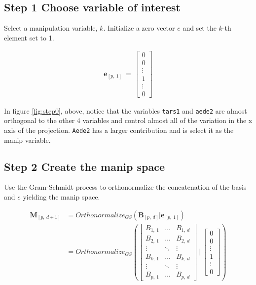 \documentclass{monashthesis}
\begin{document}
\subsection{Step 1 Choose variable of
interest}\label{step-1-choose-variable-of-interest}

Select a manipulation variable, \(k\). Initialize a zero vector \(e\)
and set the \(k\)-th element set to 1.

\begin{align*}
\textbf{e}_{[p,~1]} ~=~
  \begin{bmatrix}
    0 \\
    0 \\
    \vdots \\
    1 \\
    \vdots \\
    0
  \end{bmatrix}
\end{align*}

In figure \ref{fig:step0}, above, notice that the variables
\texttt{tars1} and \texttt{aede2} are almost orthogonal to the other 4
variables and control almost all of the variation in the x axis of the
projection. \texttt{Aede2} has a larger contribution and is select it as
the manip variable.

\subsection{Step 2 Create the manip
space}\label{step-2-create-the-manip-space}

Use the Gram-Schmidt process to orthonormalize the concatenation of the
basis and \(e\) yielding the manip space.

\begin{align*}
  \textbf{M}_{[p,~d+1]}
  &= Orthonormalize_{GS}( \textbf{B}_{[p,~d]}|\textbf{e}_{[p,~1]} ) \\
  &= Orthonormalize_{GS}
  \left(
    \begin{bmatrix}
      B_{1,~1} & \dots  & B_{1,~d} \\
      B_{2,~1} & \dots  & B_{2,~d} \\
      \vdots   & \ddots & \vdots   \\
      B_{k,~1} & \dots  & B_{k,~d} \\
      \vdots   & \ddots & \vdots   \\
      B_{p,~1} & \dots  & B_{p,~d}
    \end{bmatrix}
  ~|~
    \begin{bmatrix}
      0 \\
      0 \\
      \vdots \\
      1 \\
      \vdots \\
      0
    \end{bmatrix}
  \right)
\end{align*}
\end{document}
